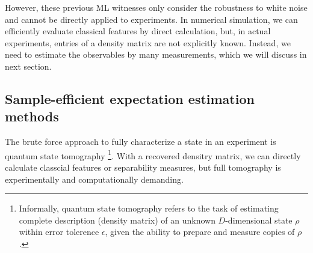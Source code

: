 \documentclass[
aps,
pra,
twocolumn,
floatfix,
]{revtex4-2}
\theoremstyle{plain}
\theoremstyle{definition}
\newtheorem{problem}{Problem}
\newcommand{\dm}{\rho}
\begin{document}
However, these previous ML witnesses only consider the robustness to white noise and cannot be directly applied to experiments.
In numerical simulation, we can efficiently evaluate classical features by direct calculation, 
but, in actual experiments, entries of a density matrix are not explicitly known.
Instead, we need to estimate the observables by many measurements, which we will discuss in next section.



\subsection{Sample-efficient expectation estimation methods}\label{sec:estimation}
The brute force approach to fully characterize a state in an experiment is quantum state tomography \cite{altepeterPhotonicStateTomography2005}
\footnote{Informally, quantum state tomography refers to the task of estimating complete description (density matrix) of an unknown $D$-dimensional state $\dm$ within error tolerence $\epsilon$, 
given the ability to prepare and measure copies of $\dm$.}.
With a recovered densitry matrix, we can directly calculate classcial features or separability measures,
but full tomography is experimentally and computationally demanding.
\end{document}
